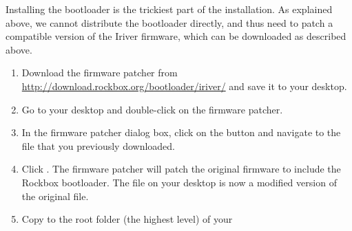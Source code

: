 
  Installing the bootloader is the trickiest part of the installation.
  As explained above, we cannot distribute the bootloader directly, and
  thus need to patch a compatible version of the Iriver firmware, which
  can be downloaded as described above.


\begin{enumerate}
  \item Download the firmware patcher  from 
  \url{http://download.rockbox.org/bootloader/iriver/} and save it to your desktop.
  \item Go to your desktop and double-click on the firmware patcher.
  \item In the firmware patcher dialog box, click on the 
  button and navigate
  to the  file that you previously downloaded.
  \item Click . The firmware patcher will patch the
    original firmware to include the Rockbox bootloader. The 
    file on your desktop is now a modified version of the original
     file.
  \item Copy  to the root folder (the highest level) of your \dap{}
\end{enumerate}
